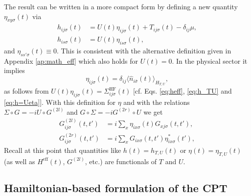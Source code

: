 \documentclass[twocolumn,prb,showpacs,aps,superscriptaddress]{revtex4}
\newcommand{\est}[1]{\ensuremath{\langle {#1} \rangle}}
\begin{document}
The result can be written in a more compact form by defining a new quantity
$\eta_{xy\sigma}(t)$ via
\begin{align}
  \label{eq:h=Ueta}
  h_{ij\sigma}(t)
  &=
  U(t)\eta_{ij\sigma}(t) + T_{ij\sigma}(t) - \delta_{ij}\mu,\\
  h_{is\sigma}(t)
  &=
  U(t)\eta_{is\sigma}(t),\nonumber
\end{align}
and $\eta_{ss'\sigma}(t)\equiv 0$.  This is consistent with the alternative
definition given in Appendix \ref{ap:math_eff} which also holds for $U(t) = 0$.
In the physical sector it implies
\begin{equation}
  \label{eq:eta_physical}
  \eta_{ij\sigma}(t) = \delta_{ij}\est{\hat{n}_{i\bar\sigma}(t)}_{H_{T, U}},
\end{equation}
as follows from $U(t)\eta_{ij\sigma}(t) = \Sigma^\text{HF}_{ij\sigma}(t)$ [cf.
Eqs. \eqref{eq:heff}, \eqref{eq:h_TU} and \eqref{eq:h=Ueta}].  With this
definition for $\eta$ and with the relations $\Sigma \circ G = -iU\circ
G^{(2l)}$ and $G \circ \Sigma = -iG^{(2r)}\circ U$ we get
\begin{align}
  \label{eq:g2l_hambased}
  G^{(2l)}_{ij\sigma}(t,t')
  &= 
  i\sum_{x} \eta_{ix\sigma}(t)G_{xj\sigma}(t,t'),\\
  G^{(2r)}_{ij\sigma}(t,t')
  &= 
  i\sum_{x} G_{ix\sigma}(t,t')\eta^*_{ix\sigma}(t'),
  \label{eq:g2r_hambased}
\end{align}
Recall at this point that quantities like $h(t) = h_{T,U}(t)$ or
$\eta(t) = \eta_{T,U}(t)$ (as well as $H^\mathrm{eff}(t)$, $G^{(2l)}$, etc.)
are functionals of $T$ and $U$. 


\subsection{Hamiltonian-based formulation of the CPT}
\end{document}
